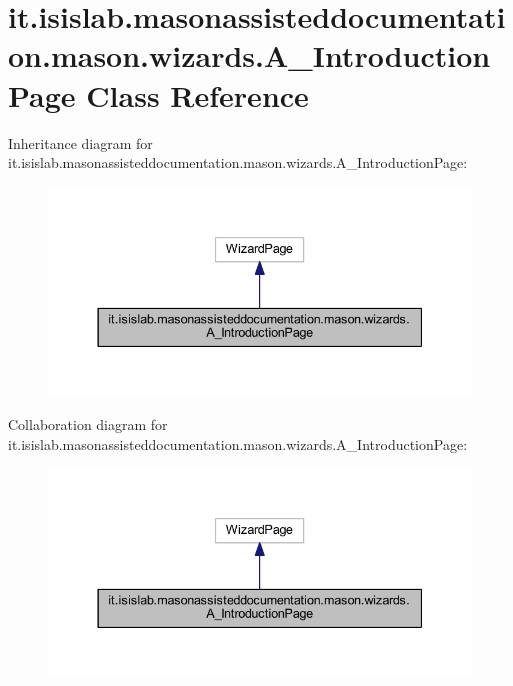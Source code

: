 \hypertarget{classit_1_1isislab_1_1masonassisteddocumentation_1_1mason_1_1wizards_1_1_a___introduction_page}{\section{it.\-isislab.\-masonassisteddocumentation.\-mason.\-wizards.\-A\-\_\-\-Introduction\-Page Class Reference}
\label{classit_1_1isislab_1_1masonassisteddocumentation_1_1mason_1_1wizards_1_1_a___introduction_page}
}


Inheritance diagram for it.\-isislab.\-masonassisteddocumentation.\-mason.\-wizards.\-A\-\_\-\-Introduction\-Page\-:
\nopagebreak
\begin{figure}[H]
\begin{center}
\leavevmode
\includegraphics[width=337pt]{classit_1_1isislab_1_1masonassisteddocumentation_1_1mason_1_1wizards_1_1_a___introduction_page__inherit__graph}
\end{center}
\end{figure}


Collaboration diagram for it.\-isislab.\-masonassisteddocumentation.\-mason.\-wizards.\-A\-\_\-\-Introduction\-Page\-:
\nopagebreak
\begin{figure}[H]
\begin{center}
\leavevmode
\includegraphics[width=337pt]{classit_1_1isislab_1_1masonassisteddocumentation_1_1mason_1_1wizards_1_1_a___introduction_page__coll__graph}
\end{center}
\end{figure}
